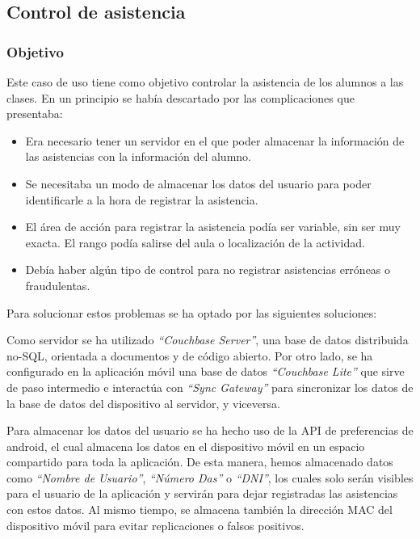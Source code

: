 \subsection{Control de asistencia}

\subsubsection{Objetivo}

Este caso de uso tiene como objetivo controlar la asistencia de los alumnos a las clases. En un principio se había descartado por las complicaciones que presentaba: 

\begin{itemize}
\item Era necesario tener un servidor en el que poder almacenar la información de las asistencias con la información del alumno.
\item Se necesitaba un modo de almacenar los datos del usuario para poder identificarle a la hora de registrar la asistencia.
\item El área de acción para registrar la asistencia podía ser variable, sin ser muy exacta. El rango podía salirse del aula o localización de la actividad.
\item Debía haber algún tipo de control para no registrar asistencias erróneas o fraudulentas.
\end{itemize}

Para solucionar estos problemas se ha optado por las siguientes soluciones: 

Como servidor se ha utilizado \textit{"`Couchbase Server"'}, una base de datos distribuida no-SQL, orientada a documentos y de código abierto. Por otro lado, se ha configurado en la aplicación móvil una base de datos \textit{"`Couchbase Lite"'} que sirve de paso intermedio e interactúa con \textit{"`Sync Gateway"'} para sincronizar los datos de la base de datos del dispositivo al servidor, y viceversa.


Para almacenar los datos del usuario se ha hecho uso de la API de preferencias de android, el cual almacena los datos en el dispositivo móvil en un espacio compartido para toda la aplicación. De esta manera, hemos almacenado datos como \textit{"`Nombre de Usuario"'}, \textit{"`Número Das"'} o \textit{"`DNI"'}, los cuales solo serán visibles para el usuario de la aplicación y servirán para dejar registradas las asistencias con estos datos. Al mismo tiempo, se almacena también la dirección MAC del dispositivo móvil para evitar replicaciones o falsos positivos.


